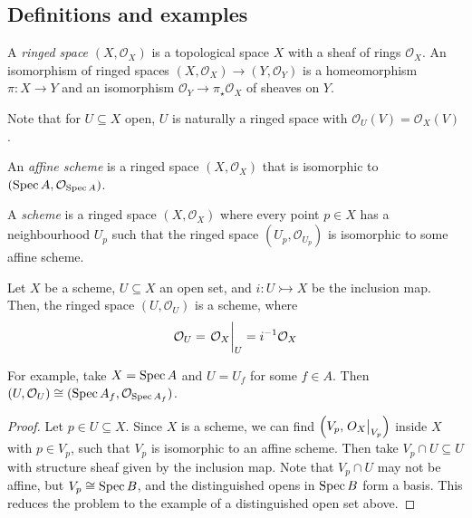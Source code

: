 \subsection{Definitions and examples}
\begin{definition}
    A \emph{ringed space} \( (X, \mathcal O_X) \) is a topological space \( X \) with a sheaf of rings \( \mathcal O_X \).
    An isomorphism of ringed spaces \( (X, \mathcal O_X) \to (Y, \mathcal O_Y) \) is a homeomorphism \( \pi : X \to Y \) and an isomorphism \( \mathcal O_Y \to \pi_\star \mathcal O_X \) of sheaves on \( Y \).
\end{definition}
Note that for \( U \subseteq X \) open, \( U \) is naturally a ringed space with \( \mathcal O_U(V) = \mathcal O_X(V) \).
\begin{definition}
    An \emph{affine scheme} is a ringed space \( (X, \mathcal O_X) \) that is isomorphic to \( (\operatorname{Spec} A, \mathcal O_{\operatorname{Spec} A}) \).
\end{definition}
\begin{definition}
    A \emph{scheme} is a ringed space \( (X, \mathcal O_X) \) where every point \( p \in X \) has a neighbourhood \( U_p \) such that the ringed space \( (U_p, \mathcal O_{U_p}) \) is isomorphic to some affine scheme.
\end{definition}
\begin{proposition}
    Let \( X \) be a scheme, \( U \subseteq X \) an open set, and \( i : U \rightarrowtail X \) be the inclusion map.
    Then, the ringed space \( (U, \mathcal O_U) \) is a scheme, where
    \[ \mathcal O_U = \eval{\mathcal O_X}_U = i^{-1} \mathcal O_X \]
\end{proposition}
For example, take \( X = \operatorname{Spec} A \) and \( U = U_f \) for some \( f \in A \).
Then \( (U, \mathcal O_U) \cong (\operatorname{Spec} A_f, \mathcal O_{\operatorname{Spec} A_f}) \).
\begin{proof}
    Let \( p \in U \subseteq X \).
    Since \( X \) is a scheme, we can find \( \qty(V_p, \eval{O_X}_{V_p}) \) inside \( X \) with \( p \in V_p \), such that \( V_p \) is isomorphic to an affine scheme.
    Then take \( V_p \cap U \subseteq U \) with structure sheaf given by the inclusion map.
    Note that \( V_p \cap U \) may not be affine, but \( V_p \cong \operatorname{Spec} B \), and the distinguished opens in \( \operatorname{Spec} B \) form a basis.
    This reduces the problem to the example of a distinguished open set above.
\end{proof}

